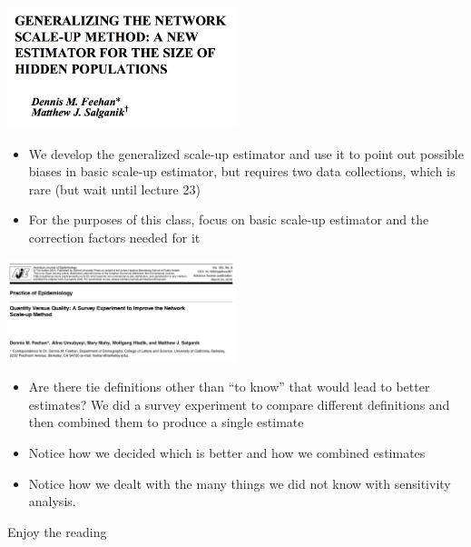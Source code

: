 \documentclass[aspectratio=169]{beamer}
\begin{document}
\begin{frame}

\begin{center}
\includegraphics[width=0.5\textwidth]{figures/feehan_generalizing_2016_title}
\end{center}

\begin{itemize}
\item We develop the generalized scale-up estimator and use it to point out possible biases in basic scale-up estimator, but requires two data collections, which is rare (but wait until lecture 23) \pause
\item For the purposes of this class, focus on basic scale-up estimator and the correction factors needed for it
\end{itemize}

\end{frame}
\begin{frame}

\begin{center}
\includegraphics[width=0.5\textwidth]{figures/feehan_quantity_2016_title}
\end{center}

\begin{itemize}
\item Are there tie definitions other than ``to know'' that would lead to better estimates? We did a survey experiment to compare different definitions and then combined them to produce a single estimate \pause
\item Notice how we decided which is better and how we combined estimates \pause
\item Notice how we dealt with the many things we did not know with sensitivity analysis. 
\end{itemize}

\end{frame}
\begin{frame}

{\Large
\begin{center}
Enjoy the reading
\end{center}
}

\end{frame}
\end{document}
